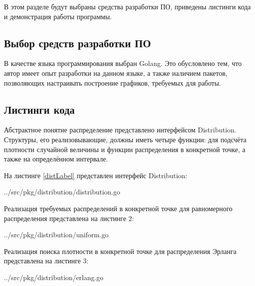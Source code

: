 В этом разделе будут выбраны средства разработки ПО, приведены листинги кода и демонстрация работы программы.

\subsection*{Выбор средств разработки ПО}
В качестве языка программирования выбран Golang. 
Это обусловлено тем, что автор имеет опыт разработки на данном языке, а также наличием пакетов, позволяющих настраивать построение графиков, требуемых для работы.

\subsection*{Листинги кода}
Абстрактное понятие распределение представлено интерфейсом Distribution. Структуры, его реализовывающие, должны иметь четыре функции: для подсчёта плотности случайной величины и функции распределения в конкретной точке, а также на определённом интервале.

На листинге \ref{distLabel} представлен интерфейс Distribution:
\FloatBarrier
\begin{lstinputlisting}[language=go, caption=Интерфейс для реализаций распределений, linerange={1-9}, 
	basicstyle=\footnotesize\ttfamily, frame=single, breaklines=true]{../src/pkg/distribution/distribution.go}
	\label{distLabel}
\end{lstinputlisting}
\FloatBarrier

\newpage

Реализация требуемых распределений в конкретной точке для равномерного распределения представлена на листинге 2:
\FloatBarrier
\begin{lstinputlisting}[language=go, caption=Расчёт значений функций для равномерного распределения, linerange={18-37}, 
	basicstyle=\footnotesize\ttfamily, frame=single, breaklines=true]{../src/pkg/distribution/uniform.go}
	\label{unif}
\end{lstinputlisting}
\FloatBarrier

Реализация поиска плотности в конкретной точке для распределения Эрланга представлена на листинге 3:
\FloatBarrier
\begin{lstinputlisting}[language=go, caption=Расчёт функции плотности для распределения Эрланга, linerange={29-38}, 
	basicstyle=\footnotesize\ttfamily, frame=single, breaklines=true]{../src/pkg/distribution/erlang.go}
	\label{er}
\end{lstinputlisting}
\FloatBarrier

